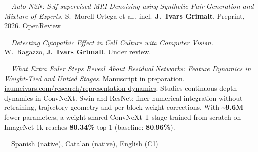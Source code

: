 \par\nopagebreak
\vspace{\acvSectionContentTopSkip}
\vspace{-2.5mm}
{\bodyfont\fontsize{7.6pt}{0.95em}\selectfont\raggedright
\noindent\textbullet~~\textit{Auto-N2N: Self-supervised MRI Denoising using Synthetic Pair Generation and Mixture of Experts.}
S.\ Morell-Ortega et al., incl.\ \textbf{J.\ Ivars Grimalt}. Preprint, 2026. \href{https://openreview.net/forum?noteId=1f93N1n8RP}{OpenReview}\par
\vspace{0.15mm}
\noindent\textbullet~~\textit{Detecting Cytopathic Effect in Cell Culture with Computer Vision.}
W.\ Ragazzo, \textbf{J.\ Ivars Grimalt}. Under review.\par
}

\par\nopagebreak
\vspace{\acvSectionContentTopSkip}
\vspace{-2.5mm}
{\bodyfont\fontsize{7.6pt}{0.95em}\selectfont\raggedright
\noindent\textbullet~~\href{https://jaumeivars.com/research/representation-dynamics}{\textit{What Extra Euler Steps Reveal About Residual Networks: Feature Dynamics in Weight-Tied and Untied Stages.}}
Manuscript in preparation. \href{https://jaumeivars.com/research/representation-dynamics}{jaumeivars.com/research/representation-dynamics}.
Studies continuous-depth dynamics in ConvNeXt, Swin and ResNet: finer numerical integration without retraining, trajectory geometry and per-block weight corrections.
With \textasciitilde\textbf{9.6M} fewer parameters, a weight-shared ConvNeXt-T stage trained from scratch on ImageNet-1k reaches \textbf{80.34\%} top-1 (baseline: \textbf{80.96\%}).\par
\vspace{0.6mm}
~~Spanish (native), Catalan (native), English (C1)\par
}
